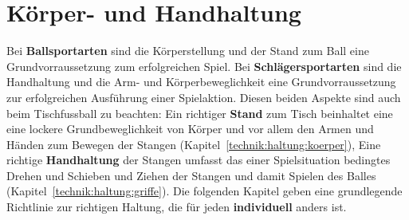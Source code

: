 \section{Körper- und Handhaltung}
\label{technik:haltung}

Bei \textbf{Ballsportarten} sind die Körperstellung und der Stand zum Ball eine Grundvorraussetzung zum erfolgreichen Spiel.
Bei \textbf{Schlägersportarten} sind die Handhaltung und die Arm- und Körperbeweglichkeit eine Grundvorraussetzung zur erfolgreichen Ausführung einer Spielaktion.
Diesen beiden Aspekte sind auch beim Tischfussball zu beachten:
Ein richtiger \textbf{Stand} zum Tisch beinhaltet eine eine lockere Grundbeweglichkeit von Körper und vor allem den Armen und Händen zum Bewegen der Stangen (Kapitel~\ref{technik:haltung:koerper}),
Eine richtige \textbf{Handhaltung} der Stangen umfasst das einer Spielsituation bedingtes Drehen und Schieben und Ziehen der Stangen und damit Spielen des Balles (Kapitel~\ref{technik:haltung:griffe}).
Die folgenden Kapitel geben eine grundlegende Richtlinie zur richtigen Haltung, die für jeden \textbf{individuell} anders ist. 

